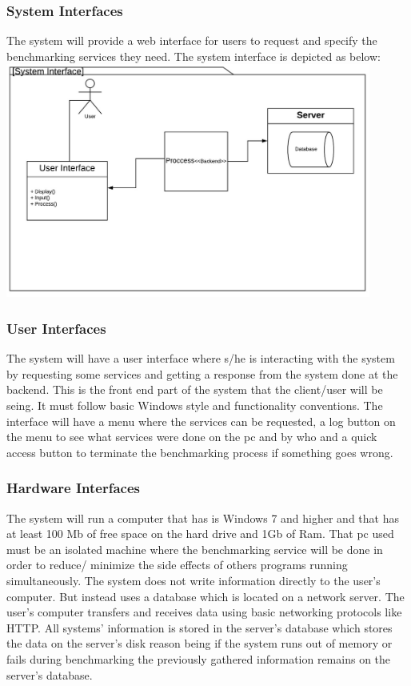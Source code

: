 \documentclass[a4paper,12pt]{article}
\begin{document}
\subsubsection{System Interfaces}
The system will provide a web interface for users to request and specify the benchmarking services they need. The system interface is depicted as below:\\
\includegraphics[width=12cm]{SI.jpeg}
\subsubsection{User Interfaces}
The system will have a user interface where s/he is interacting with the system by requesting some services and getting a response from the system done at the backend. This is the front end part of the system that the client/user will be seing. It must follow basic Windows style and functionality conventions. The interface will have a menu where the services can be requested, a log button on the menu to see what services were done on the pc and by who and a quick access button to terminate the benchmarking process if something goes wrong.
\subsubsection{Hardware Interfaces}
The system will run a computer that has is Windows 7 and higher and that has at least 100 Mb of free space on the hard drive and 1Gb of Ram. That pc used must be an isolated machine where the benchmarking service will be done in order to reduce/ minimize the side effects of others programs running simultaneously. The system does not write information directly to the user's computer. But instead uses a database which is located on a network server. The user's computer transfers and receives data using basic networking protocols like HTTP. All systems' information is stored in the server's database which stores the data on the server's disk reason being if the system runs out of memory or fails during benchmarking the previously gathered information remains on the server's database.
\end{document}
